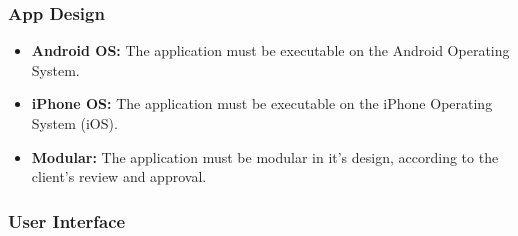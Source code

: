 \documentclass[letterpaper, 10, draftclsnofoot, onecolumn]{IEEEtran}
\begin{document}
\subsubsection{App Design}
\begin{itemize} 

\item \textbf{Android OS:} The application must be executable on the Android Operating System.
\item \textbf{iPhone OS:} The application must be executable on the iPhone Operating System (iOS).
\item \textbf{Modular: } The application must be modular in it's design, according to the client's review and approval. 

\end{itemize}
\subsubsection{User Interface}
\end{document}

